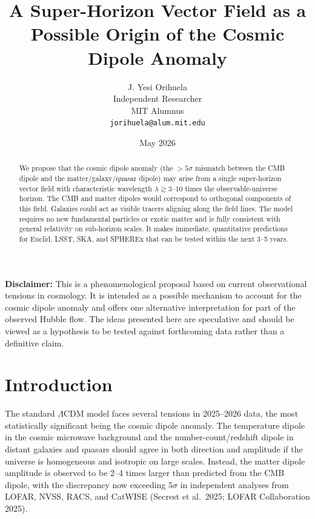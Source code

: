\documentclass[11pt,a4paper]{article}
\begin{document}
\title{\textbf{A Super-Horizon Vector Field as a Possible Origin of the Cosmic Dipole Anomaly}}

\author{J. Yesi Orihuela \\
\small Independent Researcher \\
\small MIT Alumnus \\
\small \texttt{jorihuela@alum.mit.edu}}

\date{May 2026}

\maketitle

\begin{abstract}
We propose that the cosmic dipole anomaly (the $>5\sigma$ mismatch between the CMB dipole and the matter/galaxy/quasar dipole) may arise from a single super-horizon vector field with characteristic wavelength $\lambda \gtrsim 3$--$10$ times the observable-universe horizon. The CMB and matter dipoles would correspond to orthogonal components of this field. Galaxies could act as visible tracers aligning along the field lines. The model requires no new fundamental particles or exotic matter and is fully consistent with general relativity on sub-horizon scales. It makes immediate, quantitative predictions for Euclid, LSST, SKA, and SPHEREx that can be tested within the next 3--5 years.
\end{abstract}

\textbf{Disclaimer:} This is a phenomenological proposal based on current observational tensions in cosmology. It is intended as a possible mechanism to account for the cosmic dipole anomaly and offers one alternative interpretation for part of the observed Hubble flow. The ideas presented here are speculative and should be viewed as a hypothesis to be tested against forthcoming data rather than a definitive claim.

\section{Introduction}

The standard $\Lambda$CDM model faces several tensions in 2025--2026 data, the most statistically significant being the cosmic dipole anomaly. The temperature dipole in the cosmic microwave background and the number-count/redshift dipole in distant galaxies and quasars should agree in both direction and amplitude if the universe is homogeneous and isotropic on large scales. Instead, the matter dipole amplitude is observed to be 2--4 times larger than predicted from the CMB dipole, with the discrepancy now exceeding $5\sigma$ in independent analyses from LOFAR, NVSS, RACS, and CatWISE (Secrest et al.\ 2025; LOFAR Collaboration 2025).
\end{document}
